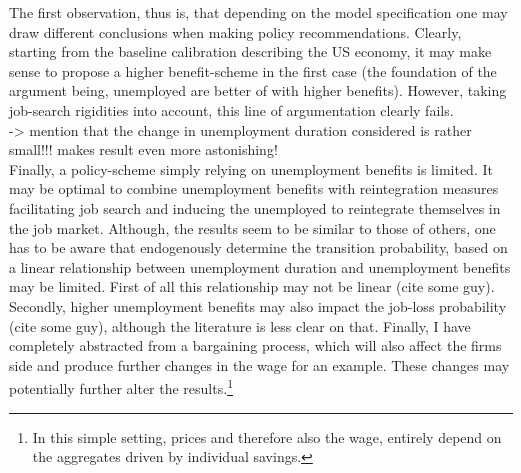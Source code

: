 \documentclass[a4paper,12pt]{article}
\begin{document}
The first observation, thus is, that depending on the model specification one may draw different conclusions when making policy recommendations. Clearly, starting from the baseline calibration describing the US economy, it may make sense to propose a higher benefit-scheme in the first case (the foundation of the argument being, unemployed are better of with higher benefits). However, taking job-search rigidities into account, this line of argumentation clearly fails. 
\\
-> mention that the change in unemployment duration considered is rather small!!! makes result even more astonishing! 
\\
Finally, a policy-scheme simply relying on unemployment benefits is limited. It may be optimal to combine unemployment benefits with reintegration measures facilitating job search and inducing the unemployed to reintegrate themselves in the job market.
Although, the results seem to be similar to those of others, one has to be aware that endogenously determine the transition probability, based on a linear relationship between unemployment duration and unemployment benefits may be limited. First of all this relationship may not be linear (cite some guy). Secondly, higher unemployment benefits may also impact the job-loss probability (cite some guy), although the literature is less clear on that. Finally, I have completely abstracted from a bargaining process, which will also affect the firms side and produce further changes in the wage\citep{mukoyama} for an example. These changes may potentially further alter the results.\footnote{In this simple setting, prices and therefore also the wage, entirely depend on the aggregates driven by individual savings.}  






\newpage





\newpage
\end{document}
